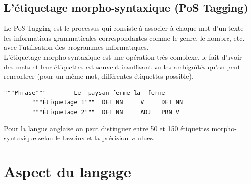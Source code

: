     \subsection{L'étiquetage morpho-syntaxique (PoS Tagging)}
    Le PoS Tagging est le processus qui consiste à associer à chaque mot d'un texte les informations grammaticales correspondantes comme le genre, le nombre, etc. avec l'utilisation des programmes informatiques.\\
    L'étiquetage morpho-syntaxique est une opération très complexe, le fait d'avoir des mots et leur étiquettes est souvent insuffisant vu les ambiguïtés qu'on peut rencontrer (pour un même mot, différentes étiquettes possible).
    \begin{lstlisting}[style=code]
        """Phrase"""        Le  paysan ferme la  ferme
        """Étiquetage 1"""  DET NN     V     DET NN
        """Étiquetage 2"""  DET NN     ADJ   PRN V
    \end{lstlisting}
    Pour la langue anglaise on peut distinguer entre 50 et 150 étiquettes morpho-syntaxique selon le besoins et la précision voulues.

\section{Aspect du langage}
